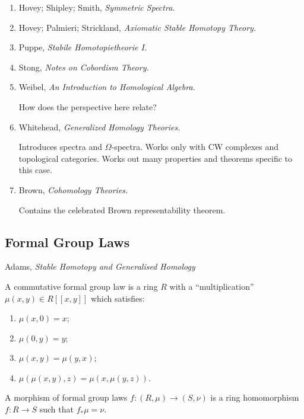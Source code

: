 \documentclass{article}%
\begin{document}
\begin{enumerate}
{\bf Heller on homology theories} A homology theory is a functor $h :
\frakC \rightarrow \calA$ with a natural transformation $\partial$
where $\calA$ is a stable abelian category, and $\frakC$ has the
following properties:
\begin{enumerate}
\item it is a category with suspension (suggests stability will be
  involved somehow)
\item it has a homotopy relation (suggests model category)
\item it has a collection of triangles (have cofibration sequence)
\end{enumerate}

\item Hovey; Shipley; Smith, {\it Symmetric Spectra.}

\item Hovey; Palmieri; Strickland, {\it Axiomatic Stable Homotopy Theory.}

\item Puppe, {\it Stabile Homotopietheorie I.}

\item Stong, {\it Notes on Cobordism Theory.}

\item Weibel, {\it An Introduction to Homological Algebra.}

  How does the perspective here relate?

\item Whitehead, {\it Generalized Homology Theories.} 

  Introduces spectra and $\Omega$-spectra. Works only with CW
  complexes and topological categories. Works out many properties and
  theorems specific to this case.

\item Brown, {\it Cohomology Theories.} 

  Contains the celebrated Brown representability theorem. 


\end{enumerate}

\subsection{Formal Group Laws}
Adams, {\it Stable Homotopy and Generalised Homology} 

\begin{definition}
A commutative formal group law is a ring $R$ with a ``multiplication''
$\mu(x,y)\in R[[x,y]]$ which satisfies:
\begin{enumerate}
  \item $\mu(x,0)=x$;
  \item $\mu(0,y)=y$;
  \item $\mu(x,y)=\mu(y,x)$;
  \item $\mu(\mu(x,y),z)=\mu(x,\mu(y,z))$.
\end{enumerate}


A morphism of formal group laws $f:(R,\mu)\rightarrow (S,\nu)$ is a
ring homomorphism $f: R \rightarrow S$ such that $f_*\mu = \nu$. 
\end{definition}
\end{document}
